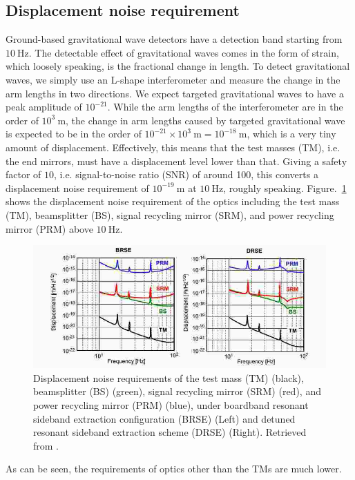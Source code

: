 \subsection{Displacement noise requirement \label{sec:displacement_noise_requirement}}
Ground-based gravitational wave detectors have a detection band starting from $10~\mathrm{Hz}$.
The detectable effect of gravitational waves comes in the form of strain, which loosely speaking, is the fractional change in length.
To detect gravitational waves, we simply use an L-shape interferometer and measure the change in the arm lengths in two directions.
We expect targeted gravitational waves to have a peak amplitude of $10^{-21}$.
While the arm lengths of the interferometer are in the order of $10^{3}~\mathrm{m}$, the change in arm lengths caused by targeted gravitational wave is expected to be in the order of $10^{-21}\times 10^{3}~\mathrm{m}=10^{-18}~\mathrm{m}$, which is a very tiny amount of displacement.
Effectively, this means that the test masses (TM), i.e. the end mirrors, must have a displacement level lower than that.
Giving a safety factor of $10$, i.e. signal-to-noise ratio (SNR) of around 100, this converts a displacement noise requirement of $10^{-19}~\mathrm{m}$ at $10~\mathrm{Hz}$, roughly speaking. Figure.~\ref{fig:displacementnoiserequirement} shows the displacement noise requirement of the optics including the test mass (TM), beamsplitter (BS), signal recycling mirror (SRM), and power recycling mirror (PRM) above $10~\mathrm{Hz}$.
\begin{figure}[!h]
	\centering
	\includegraphics[width=0.7\linewidth]{figures/displacement_noise_requirement}
	\caption{Displacement noise requirements of the test mass (TM) (black), beamsplitter (BS) (green), signal recycling mirror (SRM) (red), and power recycling mirror (PRM) (blue), under boardband resonant sideband extraction configuration (BRSE) (Left) and detuned resonant sideband extraction scheme (DRSE) (Right). Retrieved from \cite{Sekiguchi:2016bmv}.}
	\label{fig:displacementnoiserequirement}
\end{figure}
As can be seen, the requirements of optics other than the TMs are much lower.
